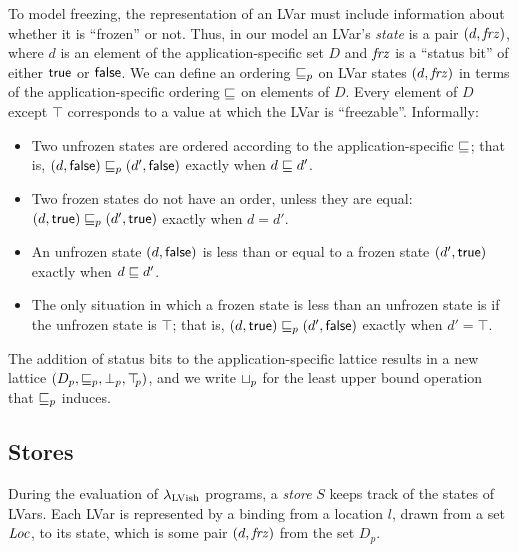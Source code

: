 \documentclass{article}
\begin{document}
To model freezing, the representation of an LVar must include
information about whether it is ``frozen'' or not.  Thus, in our model
an LVar's \emph{state} is a pair $(d, \mathit{frz})$, where $d$ is an
element of the application-specific set $D$ and $\mathit{frz}$ is a
``status bit'' of either $\textsf{true}$ or $\textsf{false}$.  We can
define an ordering $\sqsubseteq_p$ on LVar states $(d, \mathit{frz})$ in
terms of the application-specific ordering $\sqsubseteq$ on elements of
$D$.  Every element of $D$ except $\top$ corresponds to a value at
which the LVar is ``freezable''.  Informally:
\begin{itemize}
\item Two unfrozen states are ordered according to the
  application-specific $\sqsubseteq$; that is, $(d, \textsf{false})
  \sqsubseteq_p (d', \textsf{false})$ exactly when $d \sqsubseteq d'$.
\item Two frozen states do not have an order, unless they are equal:
  $(d, \textsf{true}) \sqsubseteq_p (d', \textsf{true})$ exactly when
  $d = d'$.
\item An unfrozen state $(d, \textsf{false})$ is less than or
  equal to a frozen state $(d', \textsf{true})$ exactly when $d
  \sqsubseteq d'$.
\item The only situation in which a frozen state is less than an
  unfrozen state is if the unfrozen state is $\top$; that is,
  $(d, \textsf{true}) \sqsubseteq_p (d', \textsf{false})$ exactly when
  $d' = \top$.
\end{itemize}
The addition of status bits to the application-specific lattice
results in a new lattice $(D_p, \sqsubseteq_p, \bot_{p}, \top\hspace{-0.85mm}_{p})$, and we write
$ \sqcup_p $ for the least upper bound operation that $\sqsubseteq_p$ induces.

\subsection{Stores}

During the evaluation of $\lambda_{\textrm{LVish}}$ programs, a \emph{store} $S$
keeps track of the states of LVars.  Each LVar is represented by a
binding from a location $l$, drawn from a set $\mathit{Loc}$, to its state,
which is some pair $(d, \mathit{frz})$ from the set $D_p$.
\end{document}
